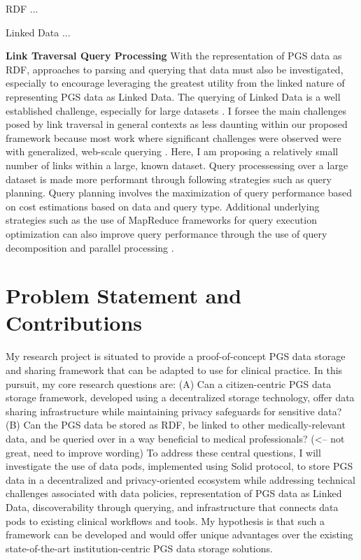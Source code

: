 \documentclass[runningheads]{llncs}
\begin{document}
RDF ...

Linked Data ...

\textbf{Link Traversal Query Processing}
With the representation of PGS data as RDF, approaches to parsing and querying that data must also be investigated, especially to encourage leveraging the greatest utility from the linked nature of representing PGS data as Linked Data.
The querying of Linked Data is a well established challenge, especially for large datasets \cite{taelman_evaluation_2023}.
I forsee the main challenges posed by link traversal in general contexts as less daunting within our proposed framework because most work where significant challenges were observed were with generalized, web-scale querying \cite{taelman_evaluation_2023}. 
Here, I am proposing a relatively small number of links within a large, known dataset. 
Query processessing over a large dataset is made more performant through following strategies such as query planning.
Query planning involves the maximization of query performance based on cost estimations based on data and query type. 
Additional underlying strategies such as the use of MapReduce frameworks for query execution optimization can also improve query performance through the use of query decomposition and parallel processing \cite{shim_mapreduce_2013}.  


\section{Problem Statement and Contributions}

My research project is situated to provide a proof-of-concept PGS data storage and sharing framework that can be adapted to use for clinical practice. In this pursuit, my core research questions are: 
(A) Can a citizen-centric PGS data storage framework, developed using a decentralized storage technology, offer data sharing infrastructure while maintaining privacy safeguards for sensitive data? 
(B) Can the PGS data be stored as RDF, be linked to other medically-relevant data, and be queried over in a way beneficial to medical professionals? (<-- not great, need to improve wording)
To address these central questions, I will investigate the use of data pods, implemented using Solid protocol, to store PGS data in a decentralized and privacy-oriented ecosystem while addressing technical challenges associated with data policies, representation of PGS data as Linked Data, discoverability through querying, and infrastructure that connects data pods to existing clinical workflows and tools. 
My hypothesis is that such a framework can be developed and would offer unique advantages over the existing state-of-the-art institution-centric PGS data storage solutions. 
\end{document}
